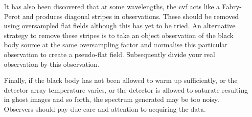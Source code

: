 \documentclass[a4paper]{book}
\renewcommand{\_}{{\tt\char'137}}
\begin{document}
It has also been discovered that at some wavelengths, the {\sc cvf} acts
like a Fabry-Perot and produces diagonal stripes in observations. These
should be removed using oversampled {\sc flat} fields although this has
yet to be tried. An alternative strategy to remove these stripes is to
take an {\sc object} observation of the black body source at the same
oversampling factor and normalise this particular observation to create a
pseudo-{\sc flat} field. Subsequently divide your real observation by this
observation.

Finally, if the black body has not been allowed to warm up sufficiently,
or the detector array temperature varies, or the detector is allowed to
saturate resulting in ghost images and so forth, the spectrum generated
may be too noisy. Observers should pay due care and attention to acquiring
the data.
\end{document}
